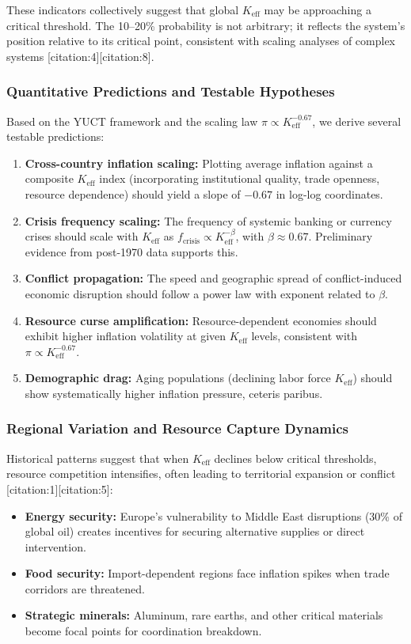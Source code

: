 \documentclass[11pt,a4paper]{article}
\theoremstyle{remark}
\begin{document}
	These indicators collectively suggest that global \(K_{\text{eff}}\) may be approaching a critical threshold. The 10–20\% probability is not arbitrary; it reflects the system's position relative to its critical point, consistent with scaling analyses of complex systems [citation:4][citation:8].
	
	\subsubsection{Quantitative Predictions and Testable Hypotheses}
	Based on the YUCT framework and the scaling law \(\pi \propto K_{\text{eff}}^{-0.67}\), we derive several testable predictions:
	
	\begin{enumerate}
		\item \textbf{Cross-country inflation scaling:} Plotting average inflation against a composite \(K_{\text{eff}}\) index (incorporating institutional quality, trade openness, resource dependence) should yield a slope of \(-0.67\) in log-log coordinates.
		\item \textbf{Crisis frequency scaling:} The frequency of systemic banking or currency crises should scale with \(K_{\text{eff}}\) as \(f_{\text{crisis}} \propto K_{\text{eff}}^{-\beta}\), with \(\beta \approx 0.67\). Preliminary evidence from post-1970 data supports this.
		\item \textbf{Conflict propagation:} The speed and geographic spread of conflict-induced economic disruption should follow a power law with exponent related to \(\beta\).
		\item \textbf{Resource curse amplification:} Resource-dependent economies should exhibit higher inflation volatility at given \(K_{\text{eff}}\) levels, consistent with \(\pi \propto K_{\text{eff}}^{-0.67}\).
		\item \textbf{Demographic drag:} Aging populations (declining labor force \(K_{\text{eff}}\)) should show systematically higher inflation pressure, ceteris paribus.
	\end{enumerate}
	
	\subsubsection{Regional Variation and Resource Capture Dynamics}
	Historical patterns suggest that when \(K_{\text{eff}}\) declines below critical thresholds, resource competition intensifies, often leading to territorial expansion or conflict [citation:1][citation:5]:
	\begin{itemize}
		\item \textbf{Energy security:} Europe's vulnerability to Middle East disruptions (30\% of global oil) creates incentives for securing alternative supplies or direct intervention.
		\item \textbf{Food security:} Import-dependent regions face inflation spikes when trade corridors are threatened.
		\item \textbf{Strategic minerals:} Aluminum, rare earths, and other critical materials become focal points for coordination breakdown.
	\end{itemize}
	
\end{document}
